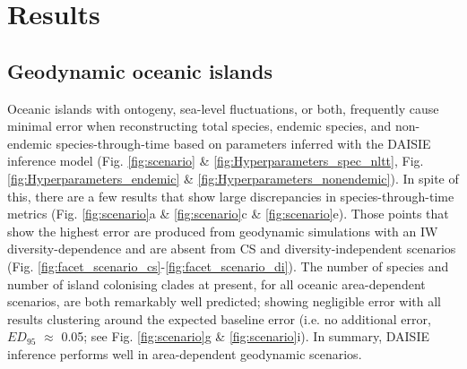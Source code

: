 \documentclass{article}
\begin{document}
\clearpage

\section*{Results}

\subsection*{Geodynamic oceanic islands}

Oceanic islands with ontogeny, sea-level fluctuations, or both, frequently cause minimal error when reconstructing total species, endemic species, and non-endemic species-through-time based on parameters inferred with the DAISIE inference model (Fig. \ref{fig:scenario} \& \ref{fig:Hyperparameters_spec_nltt}, Fig. \ref{fig:Hyperparameters_endemic} \& \ref{fig:Hyperparameters_nonendemic}). In spite of this, there are a few results that show large discrepancies in species-through-time metrics (Fig. \ref{fig:scenario}a \& \ref{fig:scenario}c \& \ref{fig:scenario}e). Those points that show the highest error are produced from geodynamic simulations with an IW diversity-dependence and are absent from CS and diversity-independent scenarios (Fig. \ref{fig:facet_scenario_cs}-\ref{fig:facet_scenario_di}). The number of species and number of island colonising clades at present, for all oceanic area-dependent scenarios, are both remarkably well predicted; showing negligible error with all results clustering around the expected baseline error (i.e. no additional error, $ED_{95}$ $\approx$ 0.05; see Fig. \ref{fig:scenario}g \& \ref{fig:scenario}i). In summary, DAISIE inference performs well in area-dependent geodynamic scenarios. \\
\end{document}

